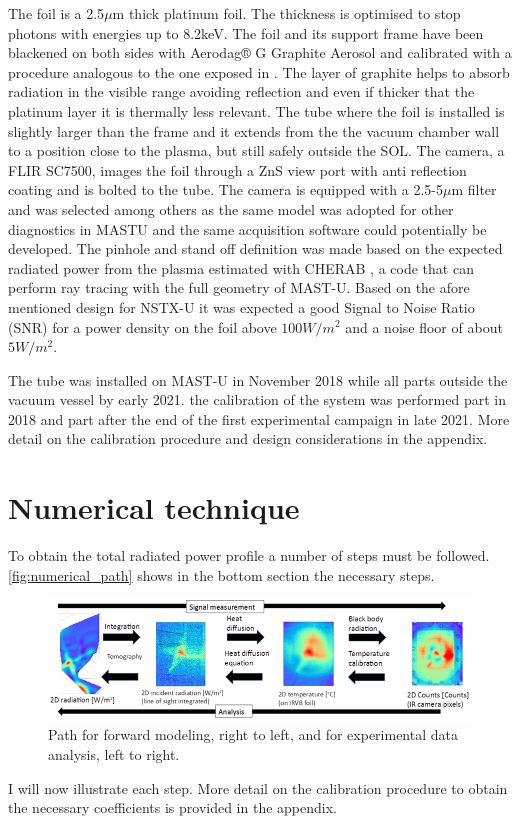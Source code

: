 The foil is a 2.5$\mu$m thick platinum foil. The thickness is optimised to stop photons with energies up to 8.2keV. \cite{PETERSON2010} The foil and its support frame have been blackened on both sides with Aerodag® G Graphite Aerosol and calibrated with a procedure analogous to the one exposed in \cite{Itomi2014}. The layer of graphite helps to absorb radiation in the visible range avoiding reflection and even if thicker that the platinum layer it is thermally less relevant. \cite{VanEden2018} The tube where the foil is installed is slightly larger than the frame and it extends from the the vacuum chamber wall to a position close to the plasma, but still safely outside the SOL. The camera, a FLIR SC7500, images the foil through a ZnS view port with anti reflection coating and is bolted to the tube. The camera is equipped with a 2.5-5$\mu$m filter and was selected among others as the same model was adopted for other diagnostics in MASTU and the same acquisition software could potentially be developed.
The pinhole and stand off definition was made based on the expected radiated power from the plasma estimated with CHERAB \cite{C.GiroudA.MeakinsM.CarrA.Baciero2018}\cite{Carr2017}\cite{A.MeakinsCarrM.2017}, a code that can perform ray tracing with the full geometry of MAST-U.  Based on the afore mentioned design for NSTX-U it was expected a good Signal to Noise Ratio (SNR) for a power density on the foil above $100W/m^2$ and a noise floor of about $5W/m^2$. \cite{Reinke2018} 

The tube was installed on MAST-U in November 2018 while all parts outside the vacuum vessel by early 2021. the calibration of the system was performed part in 2018 and part after the end of the first experimental campaign in late 2021. More detail on the calibration procedure and design considerations in the appendix.


\section{Numerical technique}
To obtain the total radiated power profile a number of steps must be followed. \autoref{fig:numerical_path} shows in the bottom section the necessary steps.

\begin{figure}
	\centering
	\includegraphics[width=\linewidth]{Chapters/chapter2/figs/numerical_path.png}
	\caption{Path for forward modeling, right to left, and for experimental data analysis, left to right.}
	\label{fig:numerical_path}
\end{figure}
I will now illustrate each step. More detail on the calibration procedure to obtain the necessary coefficients is provided in the appendix.

